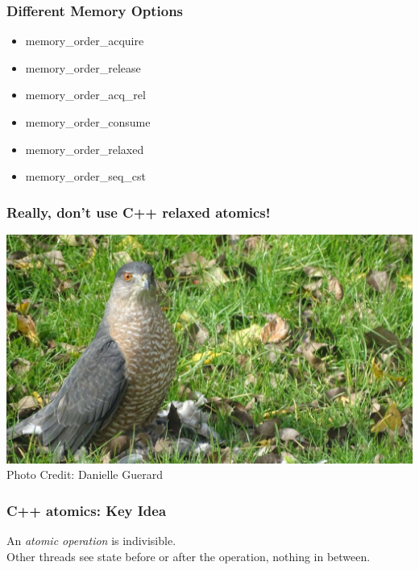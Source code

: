 \begin{frame}
\frametitle{Different Memory Options}

\begin{itemize}
		\item memory\_order\_acquire
		\item memory\_order\_release
		\item memory\_order\_acq\_rel
		\item memory\_order\_consume
		\item memory\_order\_relaxed
		\item memory\_order\_seq\_cst
\end{itemize}

\end{frame}

\begin{frame}[fragile]
  \frametitle{Really, don't use C++ relaxed atomics!}
  \begin{center}
    \includegraphics[width=.8\textwidth]{images/disapproving-bird}\\
    Photo Credit: Danielle Guerard
  \end{center}
\end{frame}

\begin{frame}[fragile]
  \frametitle{C++ atomics: Key Idea}
  
    An \emph{atomic operation} is indivisible.\\[1em]
    Other threads see state before or after the operation,
    nothing in between.
  
\end{frame}

